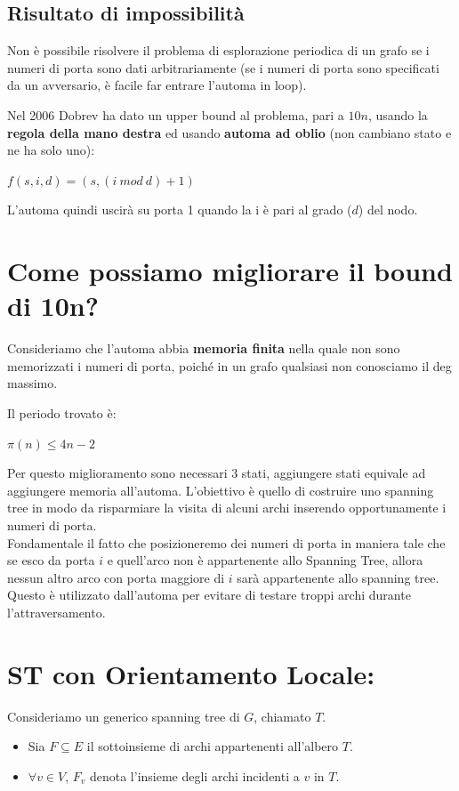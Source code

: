 \subsection*{Risultato di impossibilità}
Non è possibile risolvere il problema di esplorazione periodica di un grafo se i
numeri di porta sono dati arbitrariamente (se i numeri di porta sono specificati
da un avversario, è facile far entrare l'automa in loop).

Nel 2006 Dobrev ha dato un upper bound al problema, pari a $10n$, usando la
\textbf{regola della mano destra} ed usando \textbf{automa ad oblio} (non
cambiano stato e ne ha solo uno):
\begin{center}
    $f(s,i,d) = (s,(i~mod~d) + 1)$
\end{center}
L'automa quindi uscirà su porta 1 quando la i è pari al grado ($d$) del nodo.

\section{Come possiamo migliorare il bound di 10n?}
Consideriamo che l'automa abbia \textbf{memoria finita} nella quale non sono
memorizzati i numeri di porta, poiché in un grafo qualsiasi non conosciamo il
deg massimo.

Il periodo trovato è:
\begin{center}
    $\pi(n) \leq 4n-2$
\end{center}
Per questo miglioramento sono necessari 3 stati, aggiungere stati equivale ad
aggiungere memoria all'automa. L'obiettivo è quello di costruire uno spanning
tree in modo da risparmiare la visita di alcuni archi inserendo opportunamente i
numeri di porta. \\
Fondamentale il fatto che posizioneremo dei numeri di porta in maniera tale che
se esco da porta $i$ e quell'arco non è appartenente allo Spanning Tree, allora
nessun altro arco con porta maggiore di $i$ sarà appartenente allo spanning
tree. Questo è utilizzato dall'automa per evitare di testare troppi archi
durante l'attraversamento.

\section{ST con Orientamento Locale:}
Consideriamo un generico spanning tree di $G$, chiamato $T$.
\begin{itemize}
    \item Sia $F \subseteq E$ il sottoinsieme di archi appartenenti all'albero
          $T$.
    \item $\forall v \in V$, $F_v$ denota l'insieme degli archi incidenti a $v$ in
          $T$.
\end{itemize}

